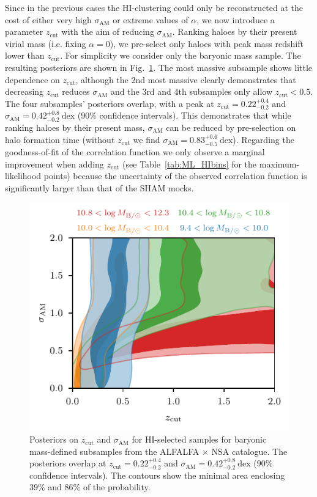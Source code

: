 \documentclass[usenatbib,useAMS]{mnras}
\newcommand{\zcut}{\ensuremath{z_{\mathrm{cut}}}}
\newcommand{\HI}{\ensuremath{\mathrm{H}\scriptstyle\mathrm{I}}}
\newcommand{\scatter}{\ensuremath{\sigma_{\mathrm{AM}}}}
\newcommand{\matched}{ALFALFA $\times$ NSA }
\begin{document}
Since in the previous cases the $\HI$-clustering could only be reconstructed at the cost of either very high $\scatter$ or extreme values of $\alpha$, we now introduce a parameter $\zcut$ with the aim of reducing $\scatter$. Ranking haloes by their present virial mass (i.e. fixing $\alpha = 0$), we pre-select only haloes with peak mass redshift lower than $\zcut$. For simplicity we consider only the baryonic mass sample. The resulting posteriors are shown in Fig.~\ref{fig:Zcut_posteriors}. The most massive subsample shows little dependence on $\zcut$, although the $2$nd most massive clearly demonstrates that decreasing $\zcut$ reduces $\scatter$ and the $3$rd and $4$th subsamples only allow $\zcut < 0.5$. The four subsamples' posteriors overlap, with a peak at $\zcut = 0.22^{+0.4}_{-0.2}$ and $\scatter = 0.42^{+0.8}_{-0.2}~\mathrm{dex}$ ($90\%$ confidence intervals). This demonstrates that while ranking haloes by their present mass, $\scatter$ can be reduced by pre-selection on halo formation time (without $\zcut$ we find $\scatter = 0.83^{+0.6}_{-0.5}~\mathrm{dex}$). Regarding the goodness-of-fit of the correlation function we only observe a marginal improvement when adding $\zcut$ (see Table~\ref{tab:ML_HIbins} for the maximum-likelihood points) because the uncertainty of the observed correlation function is significantly larger than that of the \ac{SHAM} mocks.


\begin{figure}
    \centering
    \includegraphics[width=1.0\columnwidth]{Figures/zcut.pdf}
    \caption{Posteriors on $\zcut$ and $\scatter$ for $\HI$-selected samples for baryonic mass-defined subsamples from the \matched catalogue.
    The posteriors overlap at $\zcut = 0.22^{+0.4}_{-0.2}$ and $\scatter = 0.42^{+0.8}_{-0.2}~\mathrm{dex}$ ($90\%$ confidence intervals).
    The contours show the minimal area enclosing $39\%$ and $86\%$ of the probability.}
    \label{fig:Zcut_posteriors}
\end{figure}
\end{document}
